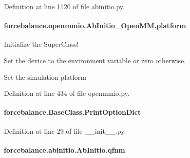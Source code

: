 Definition at line 1120 of file abinitio.\-py.

\hypertarget{classforcebalance_1_1openmmio_1_1AbInitio__OpenMM_ae6977017b553e5d6dd47258f67fcdf1c}{
\paragraph[{platform}]{\setlength{\rightskip}{0pt plus 5cm}forcebalance.\-openmmio.\-Ab\-Initio\-\_\-\-Open\-M\-M.\-platform}}\label{classforcebalance_1_1openmmio_1_1AbInitio__OpenMM_ae6977017b553e5d6dd47258f67fcdf1c}


Initialize the Super\-Class! 

Set the device to the environment variable or zero otherwise.

Set the simulation platform 

Definition at line 434 of file openmmio.\-py.

\hypertarget{classforcebalance_1_1BaseClass_afc6659278497d7245bc492ecf405ccae}{
\paragraph[{Print\-Option\-Dict}]{\setlength{\rightskip}{0pt plus 5cm}forcebalance.\-Base\-Class.\-Print\-Option\-Dict\hspace{0.3cm}{\ttfamily [inherited]}}}\label{classforcebalance_1_1BaseClass_afc6659278497d7245bc492ecf405ccae}


Definition at line 29 of file \-\_\-\-\_\-init\-\_\-\-\_\-.\-py.

\hypertarget{classforcebalance_1_1abinitio_1_1AbInitio_ac93db408472034937e79572bf872886c}{
\paragraph[{qfnm}]{\setlength{\rightskip}{0pt plus 5cm}forcebalance.\-abinitio.\-Ab\-Initio.\-qfnm\hspace{0.3cm}{\ttfamily [inherited]}}}\label{classforcebalance_1_1abinitio_1_1AbInitio_ac93db408472034937e79572bf872886c}


